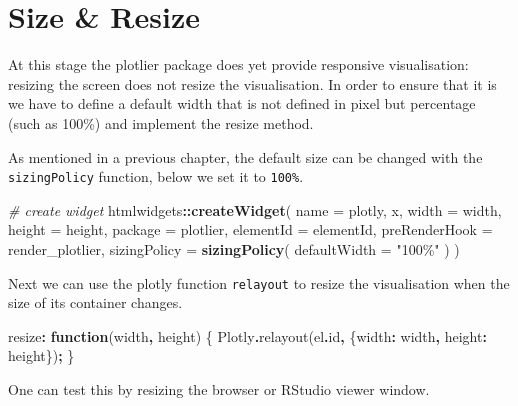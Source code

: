 \documentclass[
]{krantz}
\makeatletter
\newenvironment{Shaded}{\begin{snugshade}}{\end{snugshade}}
\newcommand{\AttributeTok}[1]{\textcolor[rgb]{0.61,0.61,0.61}{#1}}
\newcommand{\CommentTok}[1]{\textcolor[rgb]{0.37,0.37,0.37}{\textit{#1}}}
\newcommand{\DataTypeTok}[1]{\textcolor[rgb]{0.27,0.27,0.27}{#1}}
\newcommand{\FunctionTok}[1]{\textcolor[rgb]{0,0,0}{#1}}
\newcommand{\KeywordTok}[1]{\textcolor[rgb]{0.27,0.27,0.27}{\textbf{#1}}}
\newcommand{\NormalTok}[1]{#1}
\newcommand{\OperatorTok}[1]{\textcolor[rgb]{0.43,0.43,0.43}{\textbf{#1}}}
\newcommand{\StringTok}[1]{\textcolor[rgb]{0.5,0.5,0.5}{#1}}
\newenvironment{kframe}{%
\medskip{}
\setlength{\fboxsep}{.8em}
 \def\at@end@of@kframe{}%
 \ifinner\ifhmode%
  \def\at@end@of@kframe{\end{minipage}}%
  \begin{minipage}{\columnwidth}%
 \fi\fi%
 \def\FrameCommand##1{\hskip\@totalleftmargin \hskip-\fboxsep
 \colorbox{shadecolor}{##1}\hskip-\fboxsep
     \hskip-\linewidth \hskip-\@totalleftmargin \hskip\columnwidth}%
 \MakeFramed {\advance\hsize-\width
   \@totalleftmargin\z@ \linewidth\hsize
   \@setminipage}}%
 {\par\unskip\endMakeFramed%
 \at@end@of@kframe}
\renewenvironment{Shaded}{\begin{kframe}}{\end{kframe}}
\makeatother
\begin{document}
\hypertarget{size-resize}{%
\section*{Size \& Resize}\label{size-resize}}


At this stage the plotlier package does yet provide responsive visualisation: resizing the screen does not resize the visualisation. In order to ensure that it is we have to define a default width that is not defined in pixel but percentage (such as 100\%) and implement the resize method.

As mentioned in a previous chapter, the default size can be changed with the \texttt{sizingPolicy} function, below we set it to \texttt{100\%}.

\begin{Shaded}
\begin{Highlighting}[]
\CommentTok{\# create widget}
\NormalTok{htmlwidgets}\OperatorTok{::}\KeywordTok{createWidget}\NormalTok{(}
  \DataTypeTok{name =} \StringTok{\textquotesingle{}plotly\textquotesingle{}}\NormalTok{,}
\NormalTok{  x,}
  \DataTypeTok{width =}\NormalTok{ width,}
  \DataTypeTok{height =}\NormalTok{ height,}
  \DataTypeTok{package =} \StringTok{\textquotesingle{}plotlier\textquotesingle{}}\NormalTok{,}
  \DataTypeTok{elementId =}\NormalTok{ elementId,}
  \DataTypeTok{preRenderHook =}\NormalTok{ render\_plotlier,}
  \DataTypeTok{sizingPolicy =} \KeywordTok{sizingPolicy}\NormalTok{(}
    \DataTypeTok{defaultWidth =} \StringTok{"100\%"}
\NormalTok{  )}
\NormalTok{)}
\end{Highlighting}
\end{Shaded}

Next we can use the plotly function \texttt{relayout} to resize the visualisation when the size of its container changes.

\begin{Shaded}
\begin{Highlighting}[]
\NormalTok{resize}\OperatorTok{:} \KeywordTok{function}\NormalTok{(width}\OperatorTok{,}\NormalTok{ height) \{}
\NormalTok{  Plotly}\OperatorTok{.}\FunctionTok{relayout}\NormalTok{(el}\OperatorTok{.}\AttributeTok{id}\OperatorTok{,}\NormalTok{ \{}\DataTypeTok{width}\OperatorTok{:}\NormalTok{ width}\OperatorTok{,} \DataTypeTok{height}\OperatorTok{:}\NormalTok{ height\})}\OperatorTok{;}
\NormalTok{\}}
\end{Highlighting}
\end{Shaded}

One can test this by resizing the browser or RStudio viewer window.
\end{document}
